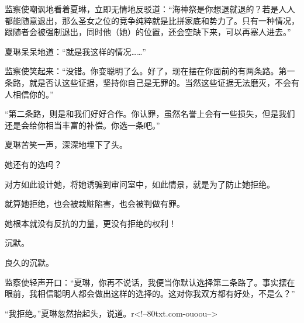 \begin{this_body}
监察使嘲讽地看着夏琳，立即无情地反驳道：“海神祭是你想退就退的？若是人人都能随意退出，那么圣女之位的竞争纯粹就是比拼家底和势力了。只有一种情况，跟随者会被强制退出，同时他（她）的位置，还会空缺下来，可以再塞人进去。”

夏琳呆呆地道：“就是我这样的情况……”

监察使笑起来：“没错。你变聪明了么。好了，现在摆在你面前的有两条路。第一条路，就是否认这些证据，坚持你自己是无罪的。当然这些证据无法磨灭，不会有人相信你的。”

“第二条路，则是和我们好好合作。你认罪，虽然名誉上会有一些损失，但是我们还是会给你相当丰富的补偿。你选一条吧。”

夏琳苦笑一声，深深地埋下了头。

她还有的选吗？

对方如此设计她，将她诱骗到审问室中，如此情景，就是为了防止她拒绝。

就算她拒绝，也会被栽赃陷害，也会被判做有罪。

她根本就没有反抗的力量，更没有拒绝的权利！

沉默。

良久的沉默。

监察使轻声开口：“夏琳，你再不说话，我便当你默认选择第二条路了。事实摆在眼前，我相信聪明人都会做出这样的选择的。这对你我双方都有好处，不是么？”

“我拒绝。”夏琳忽然抬起头，说道。r<!--80txt.com-ouoou-->

\end{this_body}

